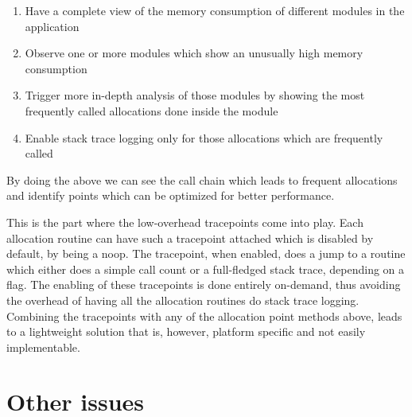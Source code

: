 \begin{enumerate}
\item Have a complete view of the memory consumption of different modules in the application
\item Observe one or more modules which show an unusually high memory consumption
\item Trigger more in-depth analysis of those modules by showing the most frequently called allocations done inside the module
\item Enable stack trace logging only for those allocations which are frequently called
\end{enumerate}

By doing the above we can see the call chain which leads to frequent allocations and identify points which can be optimized for better performance.

This is the part where the low-overhead tracepoints come into play. Each allocation routine can have such a tracepoint attached which is disabled by default, by being a noop. The tracepoint, when enabled, does a jump to a routine which either does a simple call count or a full-fledged stack trace, depending on a flag. The enabling of these tracepoints is done entirely on-demand, thus avoiding the overhead of having all the allocation routines do stack trace logging. Combining the tracepoints with any of the allocation point methods above, leads to a lightweight solution that is, however, platform specific and not easily implementable.

\section{Other issues}
\label{section:otherissues}

